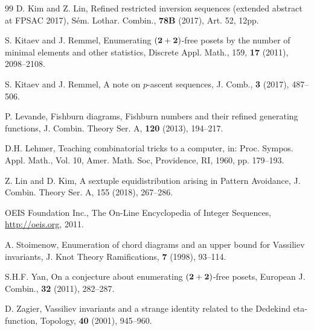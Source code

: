 \documentclass[12pt]{amsart}
\theoremstyle{plain}
\theoremstyle{definition}
\theoremstyle{example}
\theoremstyle{remark}
\numberwithin{equation}{section}
\numberwithin{figure}{section}
\begin{document}
\begin{thebibliography}{99}
 D. Kim and Z. Lin, Refined restricted inversion sequences (extended abstract at FPSAC 2017),  S\'em. Lothar. Combin., {\bf78B} (2017), Art. 52, 12pp.

S. Kitaev and J. Remmel, Enumerating $({\bf2+2})$-free posets by the number of minimal elements and other statistics, Discrete Appl. Math., 159,  {\bf17} (2011), 2098--2108.

S. Kitaev and J. Remmel, A note on $p$-ascent sequences, J. Comb., {\bf3} (2017), 487--506.

P. Levande, Fishburn diagrams, Fishburn numbers and their refined generating functions, J. Combin. Theory Ser. A, {\bf120} (2013), 194--217.

 D.H. Lehmer, Teaching combinatorial tricks to a computer, in: Proc. Sympos. Appl. Math., Vol. 10, Amer. Math. Soc, Providence, RI, 1960, pp. 179--193.

 Z. Lin and D. Kim, A sextuple equidistribution arising in Pattern Avoidance, J. Combin. Theory Ser. A, 155 (2018), 267--286.

 OEIS Foundation Inc., The On-Line Encyclopedia of Integer Sequences,  \href{http://oeis.org}{http://oeis.org}, 2011.



A. Stoimenow, Enumeration of chord diagrams and an upper bound for Vassiliev invariants,
J. Knot Theory Ramifications, {\bf7} (1998), 93--114.

 S.H.F. Yan, On a conjecture about enumerating $({\bf2+2})$-free posets, European J. Combin., {\bf32} (2011), 282--287.

D. Zagier, Vassiliev invariants and a strange identity related to the Dedekind
eta-function, Topology,  {\bf40} (2001), 945--960.












\end{thebibliography}
\end{document}
